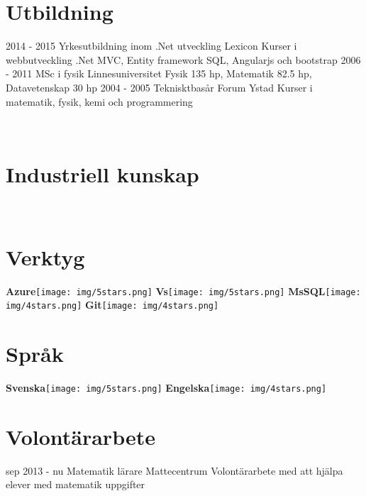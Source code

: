 \documentclass[]{friggeri-cv}
\begin{document}
\section{Utbildning}
\begin{entrylist}
   \entry
    {2014 - 2015}
    {Yrkesutbildning inom .Net utveckling}
    {Lexicon}
    {Kurser i webbutveckling .Net MVC, Entity framework SQL, Angularjs och bootstrap}
  \entry
    {2006 - 2011}
    {MSc i fysik}
    {Linnesuniversitet}
    {Fysik 135 hp, Matematik 82.5 hp, Datavetenskap 30 hp}
  \entry
    {2004 - 2005}
    {Teknisktbasår}
    {Forum Ystad}
    {Kurser i matematik, fysik, kemi och programmering}
\end{entrylist}


\begin{aside}
~
~
~
  \section{Industriell kunskap}
    ~
  \section{Verktyg}
    \textbf{Azure}\texttt{[image: img/5stars.png]}
    \textbf{Vs}\texttt{[image: img/5stars.png]}
      \textbf{MsSQL}\texttt{[image: img/4stars.png]}
    \textbf{Git}\texttt{[image: img/4stars.png]}
    ~
  \section{Språk}
    \textbf{Svenska}\texttt{[image: img/5stars.png]}
    \textbf{Engelska}\texttt{[image: img/4stars.png]}
    ~
\end{aside}

\section{Volontärarbete}
\begin{entrylist}
   \entry
    {sep 2013 - nu}
    {Matematik lärare}
    {Mattecentrum}
    {Volontärarbete med att hjälpa elever med matematik uppgifter}
\end{entrylist}
\end{document}
